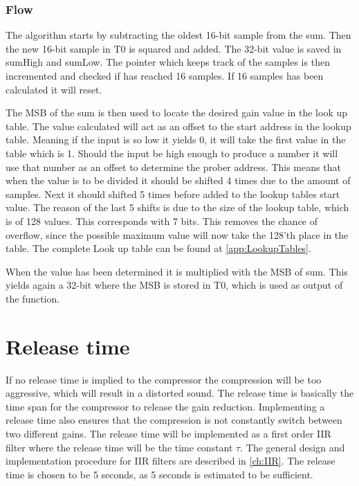 \subsubsection*{Flow}


The algorithm starts by subtracting the oldest 16-bit sample from the sum. Then the new 16-bit sample in T0 is squared and added. The 32-bit value is saved in sumHigh and sumLow. The pointer which keeps track of the samples is then incremented and checked if has reached 16 samples. If 16 samples has been calculated it will reset.

The MSB of the sum is then used to locate the desired gain value in the look up table. The value calculated will act as an offset to the start address in the lookup table. Meaning if the input is so low it yields 0, it will take the first value in the table which is 1. Should the input be high enough to produce a number it will use that number as an offset to determine the prober address. This means that when the value is to be divided it should be shifted 4 times due to the amount of samples. Next it should shifted 5 times before added to the lookup tables start value. The reason of the last 5 shifts is due to the size of the lookup table, which is of 128 values. This corresponds with 7 bits. This removes the chance of overflow, since the possible maximum value will now take the 128'th place in the table. The complete Look up table can be found at \autoref{app:LookupTables}. 

When the value has been determined it is multiplied with the MSB of sum. This yields again a 32-bit where the MSB is stored in T0, which is used as output of the function.


\section{Release time}

If no release time is implied to the compressor the compression will be too aggressive, which will result in a distorted sound. The release time is basically the time span for the compressor to release the gain reduction. Implementing a release time also ensures that the compression is not constantly switch between two different gains. The release time will be implemented as a first order IIR filter where the release time will be the time constant $\tau$. The general design and implementation procedure for IIR filters are described in \autoref{ch:IIR}. The release time is chosen to be 5 seconds, as 5 seconds is estimated to be sufficient.

